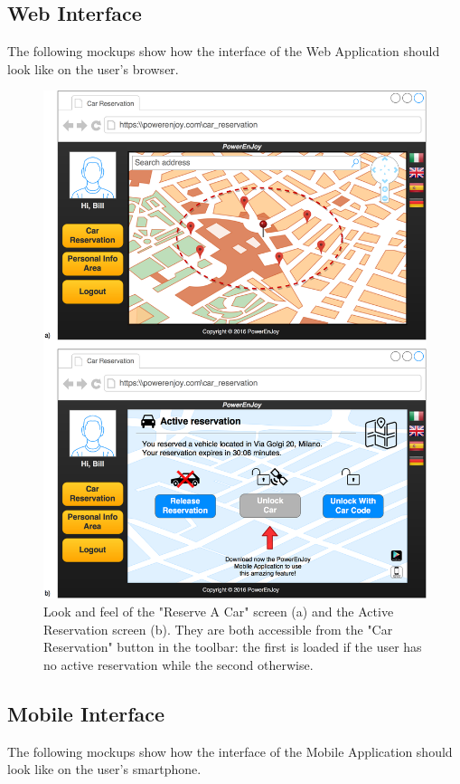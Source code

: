 \subsection{Web Interface}
The following mockups show how the interface of the Web Application should look like on the user's browser.

\begin{figure}[H]
\centering
		\includegraphics[width=\textwidth]{./user_interface_design/diagrams/web_car_reservation.png}
		\caption{Look and feel of the "Reserve A Car" screen (a) and the Active Reservation screen (b). They are both accessible from the "Car Reservation" button in the toolbar: the first is loaded if the user has no active reservation while the second otherwise.}
		\label{web_car_resrvation}
\end{figure}

\subsection{Mobile Interface}
The following mockups show how the interface of the Mobile Application should look like on the user's smartphone.

